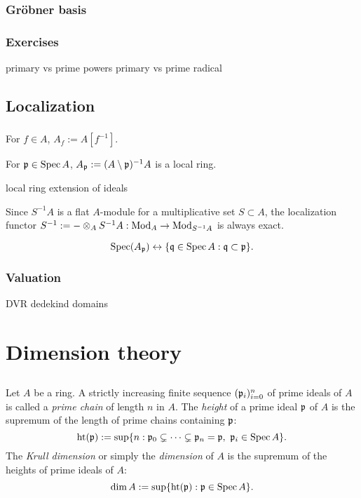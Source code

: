 \documentclass{../../large}
\newcommand{\hgt}{\operatorname{ht}}
\begin{document}
\section{Gr\"obner basis}

\begin{prb}
\end{prb}

\section*{Exercises}

primary vs prime powers
primary vs prime radical





\chapter{Localization}
\section{}

For $f\in A$, $A_f:=A[f^{-1}]$.

For $\mathfrak{p}\in\operatorname{Spec} A$, $A_{\mathfrak{p}}:=(A\setminus\mathfrak{p})^{-1}A$ is a local ring.

local ring
extension of ideals


Since $S^{-1}A$ is a flat $A$-module for a multiplicative set $S\subset A$, the localization functor $S^{-1}:=-\otimes_AS^{-1}A:\operatorname{Mod}_A\to\operatorname{Mod}_{S^{-1}A}$ is always exact.

\[\operatorname{Spec}(A_{\mathfrak{p}})\leftrightarrow\{\mathfrak{q}\in\operatorname{Spec} A:\mathfrak{q}\subset\mathfrak{p}\}.\]

\section{Valuation}

DVR
dedekind domains





\part{Dimension theory}

\chapter{}


\begin{prb}
Let $A$ be a ring.
A strictly increasing finite sequence $(\mathfrak{p}_i)_{i=0}^n$ of prime ideals of $A$ is called a \emph{prime chain} of length $n$ in $A$.
The \emph{height} of a prime ideal $\mathfrak{p}$ of $A$ is the supremum of the length of prime chains containing $\mathfrak{p}$:
\[\hgt(\fp):=\sup\{n:\fp_0\subsetneq\cdots\subsetneq\fp_n=\fp,\ \fp_i\in\Spec A\}.\]
The \emph{Krull dimension} or simply the \emph{dimension} of $A$ is the supremum of the heights of prime ideals of $A$:
\[\dim A:=\sup\{\hgt(\fp):\fp\in\Spec A\}.\]
\end{prb}
\end{document}
